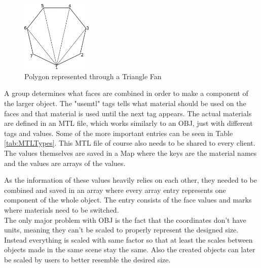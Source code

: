 \begin{figure}[htpb]
	\centering
	\includegraphics[width=0.3\textwidth]{fig/TriangleFan.pdf}
	\caption[OBJ Polygon to Triangle Fan]{Polygon represented through a Triangle Fan\protect}
	\label{fig:TriangleFan}
\end{figure}

A group determines what faces are combined in order to make a component of the larger object. The "usemtl" tags tells what material should be used on the faces and that material is used until the next tag appears. The actual materials are defined in an MTL file, which works similarly to an OBJ, just with different tags and values. Some of the more important entries can be seen in Table \ref{tab:MTLTypes}. This MTL file of course also needs to be shared to every client. The values themselves are saved in a Map where the keys are the material names and the values are arrays of the values.

\begin{table}[htbp]
	\centering 
	\caption[MTL Types]{Relevant types in MTL format}
	\label{tab:MTLTypes}
\end{table}

As the information of these values heavily relies on each other, they needed to be combined and saved in an array where every array entry represents one component of the whole object. The entry consists of the face values and marks where materials need to be switched.\\
The only major problem with OBJ is the fact that the coordinates don't have units, meaning they can't be scaled to properly represent the designed size. Instead everything is scaled with same factor so that at least the scales between objects made in the same scene stay the same. Also the created objects can later be scaled by users to better resemble the desired size.

